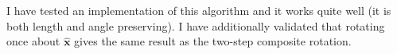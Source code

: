 \documentclass{article}
\renewcommand{\vec}[1]{\boldsymbol{#1}}
\newcommand{\vecN}[1]{\vec{\hat{#1}}}
\newcommand{\ax}{\vecN{x}}
\begin{document}

I have tested an implementation of this algorithm and it works quite well
(it is both length and angle preserving). 
I have additionally validated that rotating once about $\ax$ gives 
the same result as the two-step composite rotation.
\end{document}
